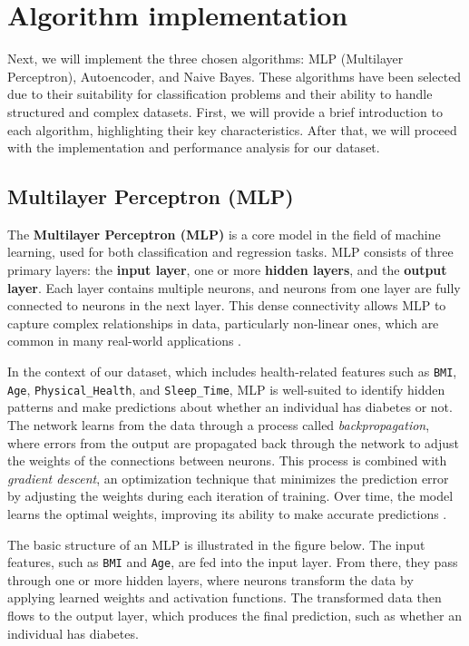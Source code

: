 \section{Algorithm implementation}
Next, we will implement the three chosen algorithms: MLP (Multilayer Perceptron), Autoencoder, and Naive Bayes. These algorithms have been selected due to their suitability for classification problems and their ability to handle structured and complex datasets. First, we will provide a brief introduction to each algorithm, highlighting their key characteristics. After that, we will proceed with the implementation and performance analysis for our dataset.

\subsection{Multilayer Perceptron (MLP)}

The \textbf{Multilayer Perceptron (MLP)} is a core model in the field of machine learning, used for both classification and regression tasks. MLP consists of three primary layers: the \textbf{input layer}, one or more \textbf{hidden layers}, and the \textbf{output layer}. Each layer contains multiple neurons, and neurons from one layer are fully connected to neurons in the next layer. This dense connectivity allows MLP to capture complex relationships in data, particularly non-linear ones, which are common in many real-world applications \cite{deeplearning1}.

In the context of our dataset, which includes health-related features such as \texttt{BMI}, \texttt{Age}, \texttt{Physical\_Health}, and \texttt{Sleep\_Time}, MLP is well-suited to identify hidden patterns and make predictions about whether an individual has diabetes or not. The network learns from the data through a process called \textit{backpropagation}, where errors from the output are propagated back through the network to adjust the weights of the connections between neurons. This process is combined with \textit{gradient descent}, an optimization technique that minimizes the prediction error by adjusting the weights during each iteration of training. Over time, the model learns the optimal weights, improving its ability to make accurate predictions \cite{nn1}.

The basic structure of an MLP is illustrated in the figure below. The input features, such as \texttt{BMI} and \texttt{Age}, are fed into the input layer. From there, they pass through one or more hidden layers, where neurons transform the data by applying learned weights and activation functions. The transformed data then flows to the output layer, which produces the final prediction, such as whether an individual has diabetes.

